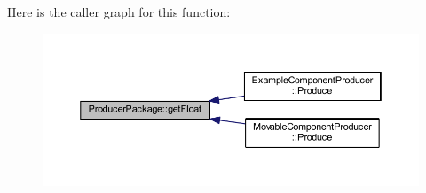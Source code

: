Here is the caller graph for this function\-:\nopagebreak
\begin{figure}[H]
\begin{center}
\leavevmode
\includegraphics[width=350pt]{class_producer_package_afc103e26ac8647b5a70baf69fbf3ca96_icgraph}
\end{center}
\end{figure}


